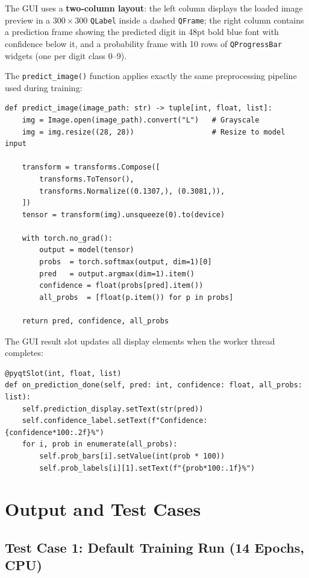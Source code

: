\documentclass[12pt,a4paper,openany]{report}
\begin{document}
The GUI uses a \textbf{two-column layout}: the left column displays the loaded image preview in a $300 \times 300$ \texttt{QLabel} inside a dashed \texttt{QFrame}; the right column contains a prediction frame showing the predicted digit in 48pt bold blue font with confidence below it, and a probability frame with 10 rows of \texttt{QProgressBar} widgets (one per digit class 0--9).

The \texttt{predict\_image()} function applies exactly the same preprocessing pipeline used during training:

\begin{verbatim}
def predict_image(image_path: str) -> tuple[int, float, list]:
    img = Image.open(image_path).convert("L")   # Grayscale
    img = img.resize((28, 28))                  # Resize to model input

    transform = transforms.Compose([
        transforms.ToTensor(),
        transforms.Normalize((0.1307,), (0.3081,)),
    ])
    tensor = transform(img).unsqueeze(0).to(device)

    with torch.no_grad():
        output = model(tensor)
        probs  = torch.softmax(output, dim=1)[0]
        pred   = output.argmax(dim=1).item()
        confidence = float(probs[pred].item())
        all_probs  = [float(p.item()) for p in probs]

    return pred, confidence, all_probs
\end{verbatim}

The GUI result slot updates all display elements when the worker thread completes:

\begin{verbatim}
@pyqtSlot(int, float, list)
def on_prediction_done(self, pred: int, confidence: float, all_probs: list):
    self.prediction_display.setText(str(pred))
    self.confidence_label.setText(f"Confidence: {confidence*100:.2f}%")
    for i, prob in enumerate(all_probs):
        self.prob_bars[i].setValue(int(prob * 100))
        self.prob_labels[i][1].setText(f"{prob*100:.1f}%")
\end{verbatim}

\chapter{Output and Test Cases}

\section{Test Case 1: Default Training Run (14 Epochs, CPU)}
\end{document}
